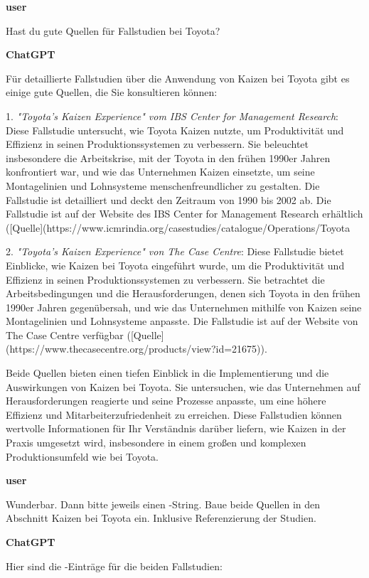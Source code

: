 \textbf{user}

Hast du gute Quellen für Fallstudien bei Toyota?

\textbf{ChatGPT}

Für detaillierte Fallstudien über die Anwendung von Kaizen bei Toyota gibt es einige gute Quellen, die Sie konsultieren können:

1. \textit{"Toyota's Kaizen Experience" vom IBS Center for Management Research}: Diese Fallstudie untersucht, wie Toyota Kaizen nutzte, um Produktivität und Effizienz in seinen Produktionssystemen zu verbessern. Sie beleuchtet insbesondere die Arbeitskrise, mit der Toyota in den frühen 1990er Jahren konfrontiert war, und wie das Unternehmen Kaizen einsetzte, um seine Montagelinien und Lohnsysteme menschenfreundlicher zu gestalten. Die Fallstudie ist detailliert und deckt den Zeitraum von 1990 bis 2002 ab. Die Fallstudie ist auf der Website des IBS Center for Management Research erhältlich ([Quelle](https://www.icmrindia.org/casestudies/catalogue/Operations/Toyota%

2. \textit{"Toyota's Kaizen Experience" von The Case Centre}: Diese Fallstudie bietet Einblicke, wie Kaizen bei Toyota eingeführt wurde, um die Produktivität und Effizienz in seinen Produktionssystemen zu verbessern. Sie betrachtet die Arbeitsbedingungen und die Herausforderungen, denen sich Toyota in den frühen 1990er Jahren gegenübersah, und wie das Unternehmen mithilfe von Kaizen seine Montagelinien und Lohnsysteme anpasste. Die Fallstudie ist auf der Website von The Case Centre verfügbar ([Quelle](https://www.thecasecentre.org/products/view?id=21675)).

Beide Quellen bieten einen tiefen Einblick in die Implementierung und die Auswirkungen von Kaizen bei Toyota. Sie untersuchen, wie das Unternehmen auf Herausforderungen reagierte und seine Prozesse anpasste, um eine höhere Effizienz und Mitarbeiterzufriedenheit zu erreichen. Diese Fallstudien können wertvolle Informationen für Ihr Verständnis darüber liefern, wie Kaizen in der Praxis umgesetzt wird, insbesondere in einem großen und komplexen Produktionsumfeld wie bei Toyota.

\textbf{user}

Wunderbar. Dann bitte jeweils einen \BibTeX{}-String. Baue beide Quellen in den Abschnitt Kaizen bei Toyota ein. Inklusive Referenzierung der Studien.

\textbf{ChatGPT}

Hier sind die \BibTeX{}-Einträge für die beiden Fallstudien:


